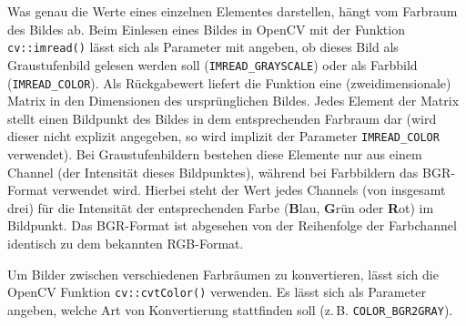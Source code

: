 \documentclass{whswinvcbook}
\begin{document}
Was genau die Werte eines einzelnen Elementes darstellen, hängt vom Farbraum des Bildes ab. Beim Einlesen eines Bildes in OpenCV mit der Funktion \texttt{cv::imread()} lässt sich als Parameter mit angeben, ob dieses Bild als Graustufenbild gelesen werden soll (\texttt{IMREAD\_GRAYSCALE}) oder als Farbbild (\texttt{IMREAD\_COLOR}). Als Rückgabewert liefert die Funktion eine (zweidimensionale) Matrix in den Dimensionen des ursprünglichen Bildes. Jedes Element der Matrix stellt einen Bildpunkt des Bildes in dem entsprechenden Farbraum dar (wird dieser nicht explizit angegeben, so wird implizit der Parameter \texttt{IMREAD\_COLOR} verwendet). Bei Graustufenbildern bestehen diese Elemente nur aus einem Channel (der Intensität dieses Bildpunktes), während bei Farbbildern das BGR-Format verwendet wird. Hierbei steht der Wert jedes Channels (von insgesamt drei) für die Intensität der entsprechenden Farbe (\textbf{B}lau, \textbf{G}rün oder \textbf{R}ot) im Bildpunkt. Das BGR-Format ist abgesehen von der Reihenfolge der Farbchannel identisch zu dem bekannten RGB-Format.

Um Bilder zwischen verschiedenen Farbräumen zu konvertieren, lässt sich die OpenCV Funktion \texttt{cv::cvtColor()} verwenden. Es lässt sich als Parameter angeben, welche Art von Konvertierung stattfinden soll (z.\,B. \texttt{COLOR\_BGR2GRAY}).\cite{opencv5}
\end{document}
